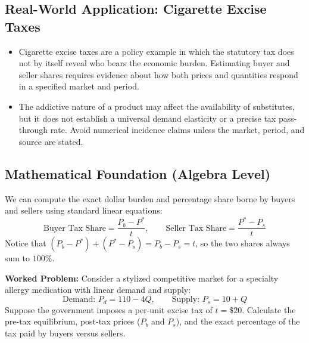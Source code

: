\documentclass[11pt,letterpaper]{article}
\begin{document}
\subsection*{Real-World Application: Cigarette Excise Taxes}
\begin{itemize}
    \item Cigarette excise taxes are a policy example in which the statutory tax does not by itself reveal who bears the economic burden. Estimating buyer and seller shares requires evidence about how both prices and quantities respond in a specified market and period.
    \item The addictive nature of a product may affect the availability of substitutes, but it does not establish a universal demand elasticity or a precise tax pass-through rate. Avoid numerical incidence claims unless the market, period, and source are stated.
\end{itemize}

\subsection*{Mathematical Foundation (Algebra Level)}
We can compute the exact dollar burden and percentage share borne by buyers and sellers using standard linear equations:
\begin{equation}
\text{Buyer Tax Share} = \frac{P_b - P^*}{t}, \qquad \text{Seller Tax Share} = \frac{P^* - P_s}{t}
\end{equation}
Notice that $(P_b - P^*) + (P^* - P_s) = P_b - P_s = t$, so the two shares always sum to $100\%$.

\noindent\textbf{Worked Problem:}
Consider a stylized competitive market for a specialty allergy medication with linear demand and supply:
\[
\text{Demand: } P_d = 110 - 4Q, \qquad \text{Supply: } P_s = 10 + Q
\]
Suppose the government imposes a per-unit excise tax of $t = \$20$. Calculate the pre-tax equilibrium, post-tax prices ($P_b$ and $P_s$), and the exact percentage of the tax paid by buyers versus sellers.
\end{document}
